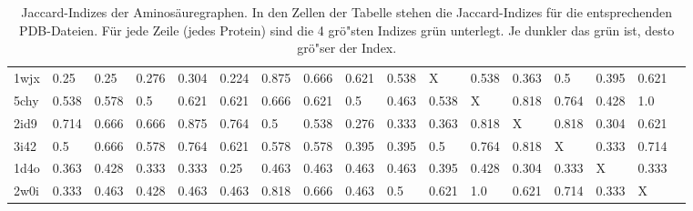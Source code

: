\documentclass{report}
\begin{document}
\begin{table}
{\begin{tabular}{l l l l l l l l l l l l l l l l l}
1wjx & 0.25 & 0.25 & 0.276 & 0.304 & 0.224 & \cellcolor{fGreen!100}0.875 & \cellcolor{fGreen!75}0.666 & \cellcolor{fGreen!50}0.621 & 0.538 &   X   & 0.538 & 0.363 & 0.5 & 0.395 & \cellcolor{fGreen!25}0.621 &  \\
5chy & 0.538 & 0.578 & 0.5 & 0.621 & 0.621 & \cellcolor{fGreen!25}0.666 & 0.621 & 0.5 & 0.463 & 0.538 &   X   & \cellcolor{fGreen!75}0.818 & \cellcolor{fGreen!50}0.764 & 0.428 & \cellcolor{fGreen!100}1.0 &  \\
2id9 & 0.714 & 0.666 & 0.666 & \cellcolor{fGreen!100}0.875 & \cellcolor{fGreen!25}0.764 & 0.5 & 0.538 & 0.276 & 0.333 & 0.363 & \cellcolor{fGreen!75}0.818 &   X   & \cellcolor{fGreen!50}0.818 & 0.304 & 0.621 &  \\
3i42 & 0.5 & 0.666 & 0.578 & \cellcolor{fGreen!50}0.764 & 0.621 & 0.578 & 0.578 & 0.395 & 0.395 & 0.5 & \cellcolor{fGreen!75}0.764 & \cellcolor{fGreen!100}0.818 &   X   & 0.333 & \cellcolor{fGreen!25}0.714 &  \\
1d4o & 0.363 & 0.428 & 0.333 & 0.333 & 0.25 & \cellcolor{fGreen!25}0.463 & \cellcolor{fGreen!50}0.463 & \cellcolor{fGreen!100}0.463 & \cellcolor{fGreen!75}0.463 & 0.395 & 0.428 & 0.304 & 0.333 &   X   & 0.333 &  \\
2w0i & 0.333 & 0.463 & 0.428 & 0.463 & 0.463 & \cellcolor{fGreen!75}0.818 & \cellcolor{fGreen!25}0.666 & 0.463 & 0.5 & 0.621 & \cellcolor{fGreen!100}1.0 & 0.621 & \cellcolor{fGreen!50}0.714 & 0.333 &   X   &  \\


\end{tabular}}
\caption{Jaccard-Indizes der Aminos\"auregraphen. In den Zellen der Tabelle stehen die Jaccard-Indizes f\"ur die entsprechenden PDB-Dateien. F\"ur jede Zeile (jedes Protein) sind die 4 gr\"o"sten Indizes gr\"un unterlegt. Je dunkler das gr\"un ist, desto gr\"o"ser der Index.}
\label{table:occ-aa-tc}
\end{table}
\end{document}
